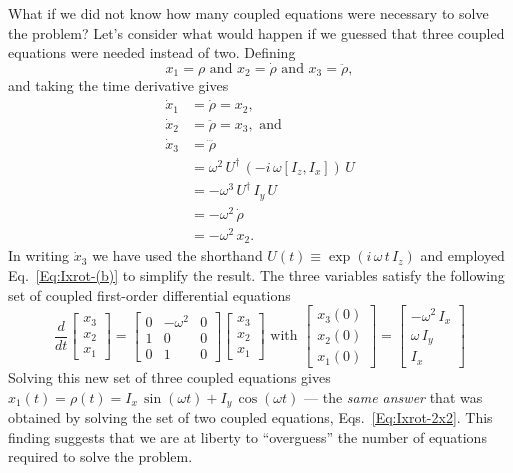 What if we did not know how many coupled equations were necessary to solve the problem?  Let's consider what would happen if we guessed that three coupled equations were needed instead of two.
Defining
\begin{equation}
x_1 = \rho \text{ and } x_2 = \dot{\rho} \text{ and } x_3 = \ddot{\rho},
\end{equation}
and taking the time derivative gives
\begin{subequations}
\begin{align}
\dot{x}_1 & = \dot{\rho} = x_2, \\
\dot{x}_2 & = \ddot{\rho} = x_3, \text{ and} \\
\dot{x}_3 & = \dddot{\rho} \\
	& = \omega^2 \, U^{\dagger} \, (-i \, \omega [I_z,I_x] ) \, U \\
	& = - \omega^3 \, U^{\dagger} \, I_{y} \, U \\
	& = - \omega^2 \, \dot{\rho} \\
	& = - \omega^2 \, x_2.
\end{align}
\end{subequations}
In writing $\dot{x}_3$ we have used the shorthand $U(t) \equiv \exp\!{\left( i \, \omega \, t \, I_z \right)}$ and employed Eq.~\ref{Eq:Ixrot-(b)} to simplify the result.  The three variables satisfy the following set of coupled first-order differential equations
\begin{equation}
\frac{d}{dt} \begin{bmatrix} x_3 \\ x_2 \\ x_1 \end{bmatrix}
	= \begin{bmatrix} 
	    0 & -\omega^2 & 0 \\
		1 & 0 & 0 \\
		0 & 1 & 0
	  \end{bmatrix}
	  \begin{bmatrix} 
	  	x_3 \\ x_2 \\ x_1
	   \end{bmatrix}
\text{ with } 
\begin{bmatrix}
    x_3(0) \\
    x_2(0) \\ 
    x_1(0) 
 \end{bmatrix}
=
\begin{bmatrix}
	- \omega^2 \, I_{x} \\ 
	\omega \, I_{y} \\
	I_{x}
\end{bmatrix}
\end{equation}
Solving this new set of three coupled equations gives $x_1(t) = \rho(t) = I_x \, \sin{(\omega t)} + I_y \, \cos{(\omega t)}$ --- the \emph{same answer} that was obtained by solving the set of two coupled equations, Eqs.~\ref{Eq:Ixrot-2x2}.  This finding suggests that we are at liberty to ``overguess'' the number of equations required to solve the problem.

